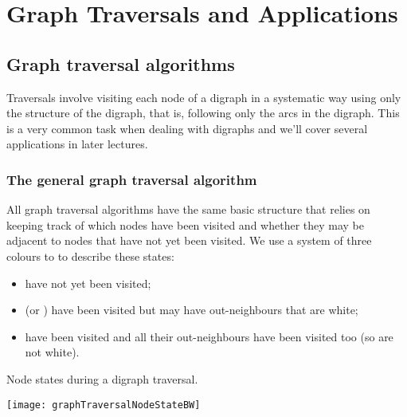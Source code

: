 \part{Graph Traversals and Applications}
\label{ch:traversal}


\chapter{Graph traversal algorithms} %

Traversals involve visiting each node of a digraph in a systematic way using only the structure of the digraph, that is, following only the arcs in the digraph. 
This is a very common task when dealing with digraphs and we'll cover several applications in later lectures.


\section{The general graph traversal algorithm}
\label{sec:trav}

All graph traversal algorithms  have the same basic structure  that relies on keeping track of which nodes have been visited 
and whether they may be adjacent to nodes that have not yet been visited. We use a system of three colours to to describe these states:
\begin{itemize} 
\item {} have not yet been visited;
\item {} (or ) have been visited but may have 
 out-neighbours that are white;
\item {} have been visited and all their out-neighbours have been visited too (so are not white). 
\end{itemize}

\begin{Boxample}
Node states during a digraph traversal.
\begin{center}
  \texttt{[image: graphTraversalNodeStateBW]}
\end{center}
\end{Boxample}



